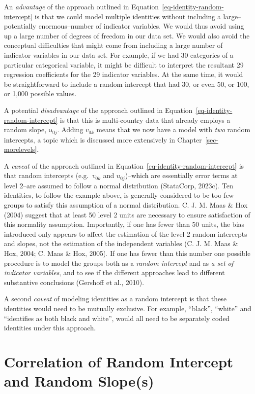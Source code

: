 \documentclass[
  letterpaper,
  DIV=11,
  numbers=noendperiod]{scrreprt}
\begin{document}
An \emph{advantage} of the approach outlined in
Equation~\ref{eq-identity-random-intercept} is that we could model
multiple identities without including a large--potentially
enormous--number of indicator variables. We would thus avoid using up a
large number of degrees of freedom in our data set. We would also avoid
the conceptual difficulties that might come from including a large
number of indicator variables in our data set. For example, if we had 30
categories of a particular categorical variable, it might be difficult
to interpret the resultant 29 regression coefficients for the 29
indicator variables. At the same time, it would be straightforward to
include a random intercept that had 30, or even 50, or 100, or 1,000
possible values.

A potential \emph{disadvantage} of the approach outlined in
Equation~\ref{eq-identity-random-intercept} is that this is
multi-country data that already employs a random slope, \(u_{0j}\).
Adding \(v_{0k}\) means that we now have a model with \emph{two} random
intercepts, a topic which is discussed more extensively in
Chapter~\ref{sec-morelevels}.

A \emph{caveat} of the approach outlined in
Equation~\ref{eq-identity-random-intercept} is that random intercepts
(e.g.~\(v_{0k}\) and \(u_{0j}\))--which are essentially error terms at
level 2--are assumed to follow a normal distribution (StataCorp, 2023c).
Ten identities, to follow the example above, is generally considered to
be too few groups to satisfy this assumption of a normal distribution.
C. J. M. Maas \& Hox (2004) suggest that at least 50 level 2 units are
necessary to ensure satisfaction of this normality assumption.
Importantly, if one has fewer than 50 units, the bias introduced only
appears to affect the estimation of the level 2 random intercepts and
slopes, not the estimation of the independent variables (C. J. M. Maas
\& Hox, 2004; C. Maas \& Hox, 2005). If one has fewer than this number
one possible procedure is to model the groups both as a \emph{random
intercept} and as \emph{a set of indicator variables}, and to see if the
different approaches lead to different substantive conclusions (Gershoff
et al., 2010).

A second \emph{caveat} of modeling identities as a random intercept is
that these identities would need to be mutually exclusive. For example,
``black'', ``white'' and ``identifies as both black and white'', would
all need to be separately coded identities under this approach.

\section{Correlation of Random Intercept and Random
Slope(s)}\label{correlation-of-random-intercept-and-random-slopes}
\end{document}
